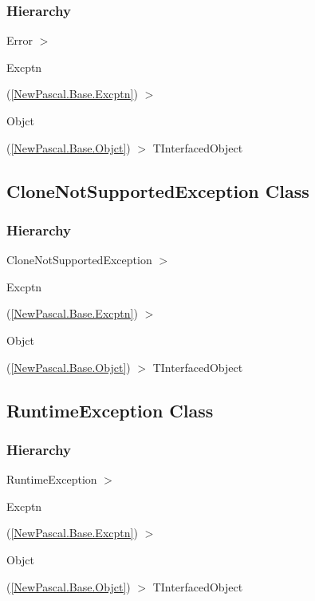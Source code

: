 \documentclass{report}
\newif\ifpdf
\begin{document}
\subsubsection*{\large{\textbf{Hierarchy}}\normalsize\hspace{1ex}\hfill}
Error {$>$} \begin{ttfamily}Excptn\end{ttfamily}(\ref{NewPascal.Base.Excptn}) {$>$} \begin{ttfamily}Objct\end{ttfamily}(\ref{NewPascal.Base.Objct}) {$>$} 
TInterfacedObject
\ifpdf
\subsection*{\large{\textbf{CloneNotSupportedException Class}}\normalsize\hspace{1ex}\hrulefill}
\else
\subsection*{CloneNotSupportedException Class}
\fi
\label{NewPascal.Base.CloneNotSupportedException}
\subsubsection*{\large{\textbf{Hierarchy}}\normalsize\hspace{1ex}\hfill}
CloneNotSupportedException {$>$} \begin{ttfamily}Excptn\end{ttfamily}(\ref{NewPascal.Base.Excptn}) {$>$} \begin{ttfamily}Objct\end{ttfamily}(\ref{NewPascal.Base.Objct}) {$>$} 
TInterfacedObject
\ifpdf
\subsection*{\large{\textbf{RuntimeException Class}}\normalsize\hspace{1ex}\hrulefill}
\else
\subsection*{RuntimeException Class}
\fi
\label{NewPascal.Base.RuntimeException}
\subsubsection*{\large{\textbf{Hierarchy}}\normalsize\hspace{1ex}\hfill}
RuntimeException {$>$} \begin{ttfamily}Excptn\end{ttfamily}(\ref{NewPascal.Base.Excptn}) {$>$} \begin{ttfamily}Objct\end{ttfamily}(\ref{NewPascal.Base.Objct}) {$>$} 
TInterfacedObject
\ifpdf
\end{document}
